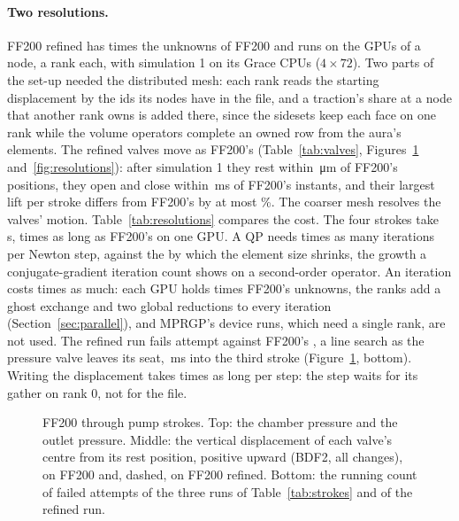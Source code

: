 \documentclass[sigconf,nonacm]{acmart}
\begin{document}
\paragraph{Two resolutions.} FF200 refined has \trResDofsRatio{} times the unknowns of FF200 and runs
on the \trGpusRefined{} GPUs of a node, a rank each, with simulation 1 on its Grace CPUs
($4\times72$). Two parts of the set-up needed the distributed mesh: each rank reads the starting
displacement by the ids its nodes have in the file, and a traction's share at a node that another
rank owns is added there, since the sidesets keep each face on one rank while the volume operators
complete an owned row from the aura's elements. The refined valves move as FF200's
(Table~\ref{tab:valves}, Figures~\ref{fig:strokes} and~\ref{fig:resolutions}): after simulation 1
they rest within \trResRest\,\si{\micro\metre} of FF200's positions, they open and close within
\trResEventShift\,\si{\milli\second} of FF200's instants, and their largest lift per stroke differs
from FF200's by at most \trResPeakDiff\%. The coarser mesh resolves the valves' motion.
Table~\ref{tab:resolutions} compares the cost. The four strokes take \trSteppingRefined\,\si{\second},
\trResSteppingRatio{} times as long as FF200's on one GPU. A QP needs \trResItsRatio{} times as many
iterations per Newton step, against the \trResExpectedIts{} by which the element size shrinks, the
growth a conjugate-gradient iteration count shows on a second-order operator. An iteration costs
\trResPerItRatio{} times as much: each GPU holds \trResWorkPerGpu{} times FF200's unknowns, the
ranks add a ghost exchange and two global reductions to every iteration
(Section~\ref{sec:parallel}), and MPRGP's device runs, which need a single rank, are not used. The
refined run fails \trFailedRefined{} attempt against FF200's \trFailedFinal{}, a line search as the
pressure valve leaves its seat, \trResFailFirst\,\si{\milli\second} into the third stroke
(Figure~\ref{fig:strokes}, bottom). Writing the displacement takes \trResWriteRatio{} times as long
per step: the step waits for its gather on rank 0, not for the file.

\begin{figure}
\centering

\caption{FF200 through \trStrokes{} pump strokes. Top: the chamber pressure and the outlet
pressure. Middle: the vertical displacement of each valve's centre from its rest position, positive
upward (BDF2, all changes), on FF200 and, dashed, on FF200 refined. Bottom: the running count of
failed attempts of the three runs of Table~\ref{tab:strokes} and of the refined run.}
\label{fig:strokes}
\end{figure}
\end{document}
